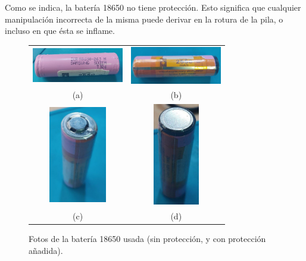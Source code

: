 \documentclass[12pt]{article}
\begin{document}
	\pagebreak
	
	\noindent Como se indica, la batería 18650 no tiene protección. Esto significa que cualquier manipulación incorrecta de la misma puede derivar en la rotura de la pila, o incluso en que ésta se inflame. \\
	
	\begin{figure}[h!]
		\begin{center}
			\begin{tabular}{cc}
				\includegraphics[width=40mm]{img/18650_sinProteccion.jpg} &   \includegraphics[width=40mm]{img/18650_conProteccion_1.jpg} \\
				(a) & (b) \\[6pt]
				\includegraphics[width=25mm]{img/18650_conProteccion_2.jpg} &   \includegraphics[width=20mm]{img/18650_conProteccion_3.jpg} \\
				(c)  & (d)  \\[6pt]
			\end{tabular}
			\caption{Fotos de la batería 18650 usada (sin protección, y con protección añadida).}
			\label{18650 con y sin proteccion}
		\end{center}
	\end{figure}
\end{document}
